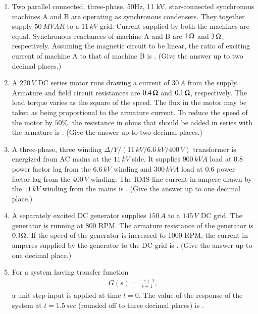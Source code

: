 \documentclass[journal,12pt,onecolumn]{IEEEtran}
\theoremstyle{remark}
\begin{document}
\begin{enumerate}
\item Two parallel connected, three-phase, 50Hz, 11 kV, star-connected synchronous machines A and B are operating as synchronous condensers. They together supply \(50 \, MVAR\) to a \(11\,kV\) grid. Current supplied by both the machines are equal. Synchronous reactances of machine A and B are \(1 \, \ohm\) and \(3 \, \ohm\), respectively.  
Assuming the magnetic circuit to be linear, the ratio of exciting current of machine A to that of machine B is \underline{\hspace{2cm}}.  
(Give the answer up to two decimal places.)


\item A \(220 \, V\) DC series motor runs drawing a current of \(30 \, A\) from the supply. Armature and field circuit resistances are \(0.4 \, \ohm\) and \(0.1 \, \ohm\), respectively. The load torque varies as the square of the speed. The flux in the motor may be taken as being proportional to the armature current. To reduce the speed of the motor by \(50\%\), the resistance in ohms that should be added in series with the armature is \underline{\hspace{2cm}}.  
(Give the answer up to two decimal places.)


\item A three-phase, three winding \(\Delta/Y/ (11\,kV/6.6\,kV/400\,V)\) transformer is energized from AC mains at the \(11 \, kV\) side. It supplies \(900 \, kVA\) load at 0.8 power factor lag from the \(6.6 \, kV\) winding and \(300 \, kVA\) load at 0.6 power factor lag from the \(400 \, V\) winding. The RMS line current in ampere drawn by the \(11\,kV\) winding from the mains is \underline{\hspace{2cm}}.  
(Give the answer up to one decimal place.)


\item A separately excited DC generator supplies \(150 \, A\) to a \(145 \, V\) DC grid. The generator is running at 800 RPM. The armature resistance of the generator is \(0.1 \ohm\). If the speed of the generator is increased to 1000 RPM, the current in amperes supplied by the generator to the DC grid is \underline{\hspace{2cm}}.  
(Give the answer up to one decimal place.)


\item For a system having transfer function  
\begin{align*}
    G(s) = \frac{-s+1}{s+1},
\end{align*}
a unit step input is applied at time \(t=0\). The value of the response of the system at \(t=1.5 \, sec\) (rounded off to three decimal places) is \underline{\hspace{2cm}}.



\end{enumerate}
\end{document}
